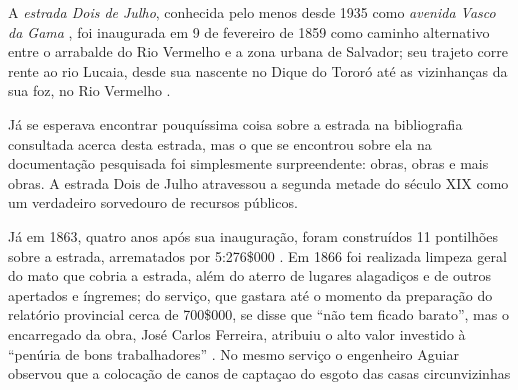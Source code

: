 
A \textit{estrada Dois de Julho}, conhecida pelo menos desde 1935 como \textit{avenida Vasco da Gama} \cite[p.~142]{souza_guia_1935}, foi inaugurada em 9 de fevereiro de 1859 \cite[p.~20]{silvalima_dique_1899} como caminho alternativo entre o arrabalde do Rio Vermelho e a zona urbana de Salvador; seu trajeto corre rente ao rio Lucaia, desde sua nascente no Dique do Tororó até as vizinhanças da sua foz, no Rio Vermelho \cite[p.~582]{ruy_politica_1949}.

Já se esperava encontrar pouquíssima coisa sobre a estrada na bibliografia consultada acerca desta estrada, mas o que se encontrou sobre ela na documentação pesquisada foi simplesmente surpreendente: obras, obras e mais obras. A estrada Dois de Julho atravessou a segunda metade do século XIX como um verdadeiro sorvedouro de recursos públicos.

Já em 1863, quatro anos após sua inauguração, foram construídos 11 pontilhões sobre a estrada, arrematados por 5:276\$000 \cite[p.~66]{bahia_rpe_1863b}. Em 1866 foi realizada limpeza geral do mato que cobria a estrada, além do aterro de lugares alagadiços e de outros apertados e íngremes; do serviço, que gastara até o momento da preparação do relatório provincial cerca de 700\$000, se disse que ``não tem ficado barato'', mas o encarregado da obra, José Carlos Ferreira, atribuiu o alto valor investido à ``penúria de bons trabalhadores'' \cite[p.~76]{bahia_rpe_1866}. No mesmo serviço o engenheiro Aguiar observou que a colocação de canos de captaçao do esgoto das casas circunvizinhas 

